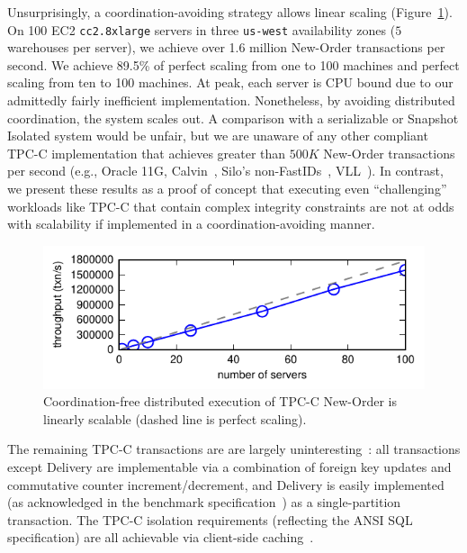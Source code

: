 Unsurprisingly, a coordination-avoiding strategy allows linear scaling
(Figure~\ref{fig:scaleout}). On 100 EC2 \texttt{cc2.8xlarge} servers
in three \texttt{us-west} availability zones ($5$ warehouses per
server), we achieve over 1.6 million New-Order transactions per
second. We achieve 89.5\% of perfect scaling from one to 100 machines
and perfect scaling from ten to 100 machines. At peak, each server is
CPU bound due to our admittedly fairly inefficient
implementation. Nonetheless, by avoiding distributed coordination, 
the system scales out. A comparison with a serializable or Snapshot
Isolated system would be unfair, but we are unaware of any other
compliant TPC-C implementation that achieves greater than $500K$
New-Order transactions per second (e.g., Oracle 11G,
Calvin~\cite{calvin}, Silo's non-FastIDs~\cite{silo},
VLL~\cite{abadi-vll}). In contrast, we present these results as a
proof of concept that executing even ``challenging'' workloads like
TPC-C that contain complex integrity constraints are not at odds with
scalability if implemented in a coordination-avoiding manner.

\begin{figure}
\begin{center}
\includegraphics[width=\columnwidth]{figs/thru_scale.pdf}\vspace{-2em}
\end{center}
\caption{Coordination-free distributed execution of TPC-C New-Order is
  linearly scalable (dashed line is perfect scaling).}
\label{fig:scaleout}
\end{figure}

 The remaining TPC-C transactions
are are largely uninteresting~\cite{calvin}: all transactions except
Delivery are implementable via a combination of foreign key updates
and commutative counter increment/decrement, and Delivery is easily
implemented (as acknowledged in the benchmark
specification~\cite{tpcc}) as a single-partition transaction. The
TPC-C isolation requirements (reflecting the ANSI SQL specification)
are all achievable via client-side caching~\cite{hat-vldb}.

